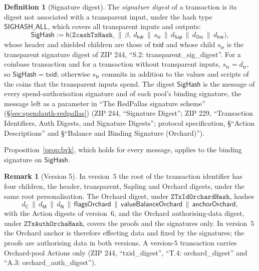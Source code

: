 \documentclass[11pt,a4paper]{article}
\theoremstyle{definition}
\newtheorem{definition}[theorem]{Definition}
\newtheorem{remark}[theorem]{Remark}
\begin{document}
\begin{definition}[Signature digest]
The \emph{signature digest} of a transaction is its digest not associated
with a transparent input, under the hash type $\mathsf{SIGHASH\_ALL}$,
which covers all transparent inputs and outputs:
\[
  \mathsf{SigHash} := \mathsf{h}\bigl(\texttt{ZcashTxHash\_} \,\|\, \beta,\
    d_{\mathsf{hdr}} \,\|\, s_{\mathsf{tr}} \,\|\, d_{\mathsf{Sap}}
    \,\|\, d_{\mathsf{Orc}} \,\|\, d_{\mathsf{Irw}}\bigr),
\]
whose header and shielded children are those of $\mathsf{txid}$ and whose
child $s_{\mathsf{tr}}$ is the transparent signature digest of ZIP 244,
``S.2: transparent\_sig\_digest''. For a coinbase transaction and for a
transaction without transparent inputs, $s_{\mathsf{tr}} = d_{\mathsf{tr}}$,
so $\mathsf{SigHash} = \mathsf{txid}$; otherwise $s_{\mathsf{tr}}$ commits in
addition to the values and scripts of the coins that the transparent inputs
spend. The digest $\mathsf{SigHash}$ is the message of every
spend-authorisation signature and of each pool's binding signature, the
message left as a parameter in ``The RedPallas signature scheme''
(\S\ref{sec:spendauth-redpallas}) (ZIP 244, ``Signature Digest''; ZIP 229,
``Transaction Identifiers, Auth Digests, and Signature Digests''; protocol
specification, \S``Action Descriptions'' and \S``Balance and Binding
Signature (Orchard)'').
\end{definition}

Proposition~\ref{prop:bvk}, which holds for every message, applies to the
binding signature on $\mathsf{SigHash}$.

\begin{remark}[Version 5]
In version~$5$ the root of the transaction identifier has four children,
the header, transparent, Sapling and Orchard digests, under the same root
personalisation. The Orchard digest, under $\texttt{ZTxIdOrchardHash}$,
hashes
\[
  d_{\mathsf{C}} \,\|\, d_{\mathsf{M}} \,\|\, d_{\mathsf{N}} \,\|\,
  \mathsf{flagsOrchard} \,\|\, \mathsf{valueBalanceOrchard} \,\|\,
  \mathsf{anchorOrchard},
\]
with the Action digests of version~$6$, and the
Orchard authorising-data digest, under $\texttt{ZTxAuthOrchaHash}$, covers
the proofs and the signatures only. In version~$5$ the Orchard anchor is
therefore effecting data and fixed by the signatures; the proofs are
authorising data in both versions. A version-$5$ transaction carries
Orchard-pool Actions only (ZIP 244, ``txid\_digest'', ``T.4:
orchard\_digest'' and ``A.3: orchard\_auth\_digest'').
\end{remark}
\end{document}
